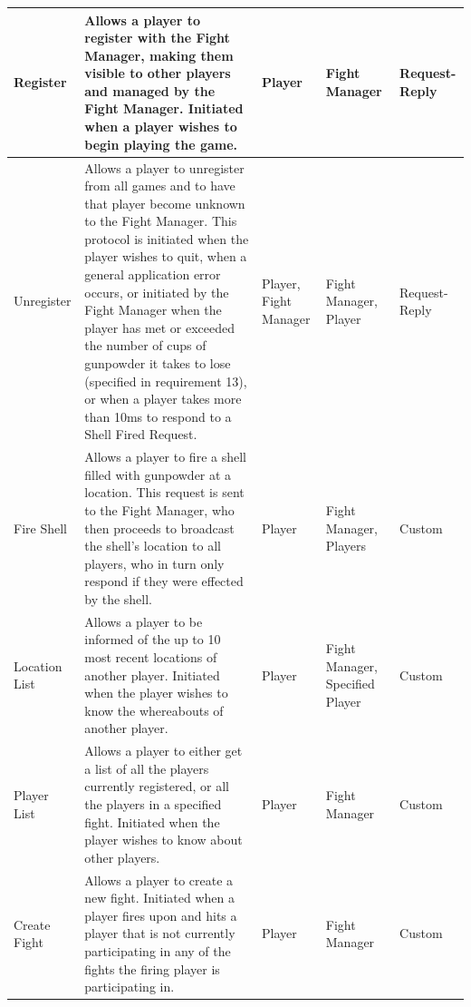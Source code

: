 \documentclass[12pt]{article}
\begin{document}
		\begin{center}
		    \begin{supertabular}{|p{2cm}|p{5cm}|p{2cm}|p{2.5cm}|l|}
		        \hline
		        	Register & Allows a player to register with the Fight Manager, making them visible to other players and managed by the Fight Manager. Initiated when a player wishes to begin playing the game.& Player & Fight Manager & Request-Reply \\ \hline
		        	Unregister & Allows a player to unregister from all games and to have that player become unknown to the Fight Manager. This protocol is initiated when the player wishes to quit, when a general application error occurs, or initiated by the Fight Manager when the player has met or exceeded the number of cups of gunpowder it takes to lose (specified in requirement 13), or when a player takes more than 10ms to respond to a Shell Fired Request.& Player, Fight Manager & Fight Manager, Player & Request-Reply \\ \hline
		        
		        	Fire Shell & Allows a player to fire a shell filled with gunpowder at a location. This request is sent to the Fight Manager, who then proceeds to broadcast the shell's location to all players, who in turn only respond if they were effected by the shell.& Player & Fight Manager, Players & Custom \\ \hline
		        
		        	Location List & Allows a player to be informed of the up to 10 most recent locations of another player. Initiated when the player wishes to know the whereabouts of another player.& Player & Fight Manager, Specified Player & Custom \\ \hline
		        	
		        	Player List &  Allows a player to either get a list of all the players currently registered, or all the players in a specified fight. Initiated when the player wishes to know about other players.& Player & Fight Manager & Custom \\ \hline
		        	
		        	Create Fight & Allows a player to create a new fight. Initiated when a player fires upon and hits a player that is not currently participating in any of the fights the firing player is participating in. & Player & Fight Manager & Custom \\ \hline
		        	

\end{supertabular}
\end{center}
\end{document}
